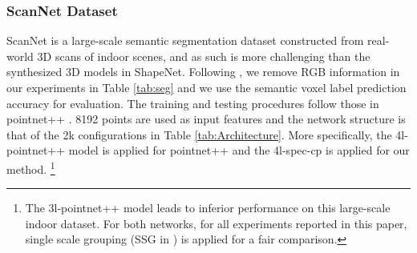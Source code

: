 \documentclass[runningheads]{llncs}
\begin{document}
\subsubsection{ScanNet Dataset}
ScanNet is a large-scale semantic segmentation dataset constructed from real-world 3D scans of indoor scenes, and as such is more challenging than the synthesized 3D models in ShapeNet. Following \cite{qi2017pointnet}\cite{dai2017scannet}, we remove RGB information in our experiments in Table \ref{tab:seg} and we use the semantic voxel label prediction accuracy for evaluation. The training and testing procedures follow those in pointnet++ \cite{qi2017pointnet}. 8192  points are used as input features and the network structure is that of the 2k configurations in Table \ref{tab:Architecture}. More specifically, the 4l-pointnet++ model is applied for pointnet++ and the 4l-spec-cp is applied for our method. \footnote{The 3l-pointnet++ model leads to inferior performance on this large-scale indoor dataset. For both networks, for all experiments reported in this paper, single scale grouping (SSG in \cite{qi2017pointnet}) is applied for a fair comparison.
}
\end{document}

